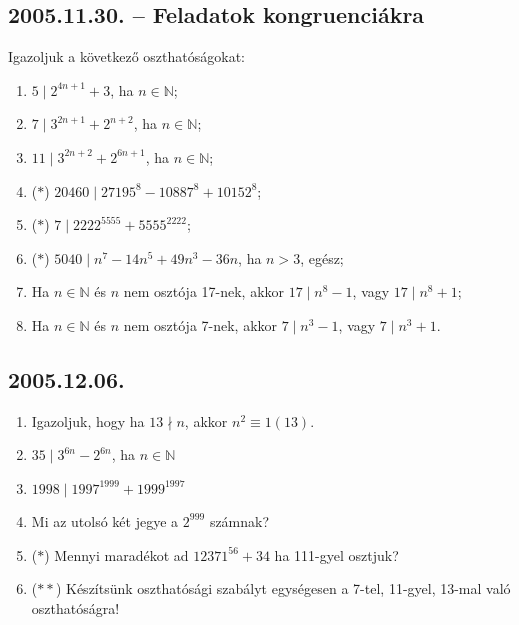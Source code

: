 \subsection*{2005.11.30. -- Feladatok kongruenciákra}
Igazoljuk a következő oszthatóságokat:

\begin{enumerate} 

\item $5\mid 2^{4n+1}+3$, ha $n\in \mathbb{N}$;
\item $7\mid  3^{2n+1}+2^{n+2}$, ha $n\in \mathbb{N}$;
\item $11\mid  3^{2n+2}+2^{6n+1}$, ha $n\in \mathbb{N}$;
\item ($*$) $20460\mid  27195^8-10887^8+10152^8$;
\item ($*$) $7 \mid  2222^{5555}+5555^{2222}$;
\item ($*$) $5040 \mid  n^7-14n^5+49n^3-36n$, ha $n>3$, egész;
\item Ha $n\in \mathbb{N}$ és $n$ nem osztója 17-nek, akkor $17\mid  n^8-1$, vagy $17 \mid  n^8+1$;
\item Ha $n\in \mathbb{N}$ és $n$ nem osztója 7-nek, akkor $7\mid  n^3-1$, vagy $7 \mid n^3+1$.

\end{enumerate}

\subsection*{2005.12.06.}
\begin{enumerate}
\item Igazoljuk, hogy ha $13\nmid n$, akkor
$n^2\equiv 1 (13)$.
\item $35\mid 3^{6n}-2^{6n}$, ha $n\in \mathbb{N}$
\item $1998\mid 1997^{1999}+1999^{1997}$
\item Mi az utolsó két jegye a $2^{999}$ számnak?
\item ($*$) Mennyi maradékot ad $12371^{56}+34$ ha 111-gyel osztjuk?
\item ($**$) Készítsünk oszthatósági szabályt egységesen a 7-tel, 11-gyel, 13-mal való oszthatóságra!
\end{enumerate}

